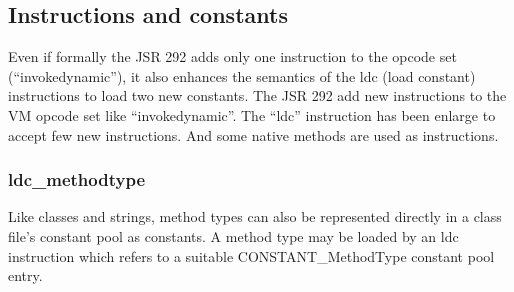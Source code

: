 \documentclass{sigplanconf}
\def \Jsr{JSR\xspace}
\def \JSR{\Jsr 292\xspace}
\def \VM{VM\xspace}
\begin{document}
% 


    \subsection{Instructions and constants}
    
    
      Even if formally the \JSR adds only one instruction to the opcode set (``invokedynamic''),
      it also enhances the semantics of the ldc (load constant) instructions to load two new constants.
      The \JSR add new instructions to the \VM opcode set like ``invokedynamic''.
      The ``ldc'' instruction has been enlarge to accept few new instructions.
      And some native methods are used as instructions.

      \subsubsection{ldc\_methodtype}
        Like classes and strings, method types can also be
        represented directly in a class file's constant pool as constants.
        A method type may be loaded by an ldc instruction which refers to a suitable
        CONSTANT\_MethodType constant pool entry.
\end{document}
